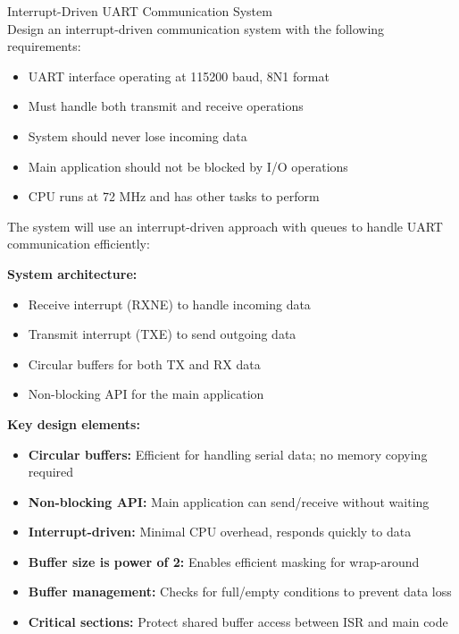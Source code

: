 \begin{example2}{Interrupt-Driven UART Communication System}\\
Design an interrupt-driven communication system with the following requirements:
\begin{itemize}
    \item UART interface operating at 115200 baud, 8N1 format
    \item Must handle both transmit and receive operations
    \item System should never lose incoming data
    \item Main application should not be blocked by I/O operations
    \item CPU runs at 72 MHz and has other tasks to perform
\end{itemize}

\tcblower

The system will use an interrupt-driven approach with queues to handle UART communication efficiently:

 \textbf{System architecture:}
   \begin{itemize}
     \item Receive interrupt (RXNE) to handle incoming data
     \item Transmit interrupt (TXE) to send outgoing data
     \item Circular buffers for both TX and RX data
     \item Non-blocking API for the main application
   \end{itemize}

\textbf{Key design elements:}
   \begin{itemize}
     \item \textbf{Circular buffers:} Efficient for handling serial data; no memory copying required
     \item \textbf{Non-blocking API:} Main application can send/receive without waiting
     \item \textbf{Interrupt-driven:} Minimal CPU overhead, responds quickly to data
     \item \textbf{Buffer size is power of 2:} Enables efficient masking for wrap-around
     \item \textbf{Buffer management:} Checks for full/empty conditions to prevent data loss
     \item \textbf{Critical sections:} Protect shared buffer access between ISR and main code
   \end{itemize}


\end{example2}

